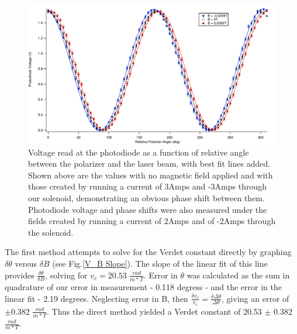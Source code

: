 \documentclass[prb,preprint]{revtex4-1}
\begin{document}
\begin{figure}[H]
\centering
\includegraphics[width=180mm]{FaradaySineWave.pdf}
\caption{Voltage read at the photodiode as a function of relative angle between the polarizer and the laser beam, with best fit lines added. Shown above are the values with no magnetic field applied and with those created by running a current of 3Amps and -3Amps through our solenoid, demonstrating an obvious phase shift between them. Photodiode voltage and phase shifts were also measured under the fields created by running a current of 2Amps and of -2Amps through the solenoid.}
\label{wave_plot}
\end{figure}

The first method attempts to solve for the Verdet constant directly by graphing $\delta \theta$ versus $\delta B$ (see Fig.\ref{V_B Slope}). The slope of the linear fit of this line provides $\frac{\delta \theta}{\delta B}$, solving for $v_c = 20.53$ $\frac{rad}{m*T}$. Error in $\theta$ was calculated as the sum in quadrature of our error in measurement - 0.118 degress - and the error in the linear fit - 2.19 degrees. Neglecting error in B, then $\frac{\delta v_c}{v_c} = \frac{\delta \Delta \theta}{\Delta \theta}$, giving an error of $\pm 0.382$ $\frac{rad}{m*T}$. Thus the direct method yielded a Verdet constant of 20.53 $\pm$ 0.382 $\frac{rad}{m*T}$.
\end{document}
